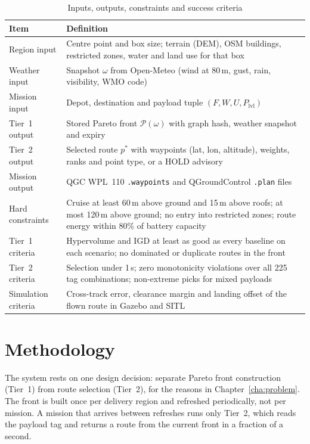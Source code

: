 \documentclass{ssnreview}
\newcommand{\flowchapter}[1]{\par\addvspace{30pt}\let\origclearpage\clearpage\let\clearpage\relax\chapter{#1}\let\clearpage\origclearpage}  %
\begin{document}
\begin{table}[H]
\centering\caption{Inputs, outputs, constraints and success criteria}\label{tab:ps-io}\small
\begin{tabularx}{\textwidth}{L{3.0cm} Y}
\toprule
\textbf{Item} & \textbf{Definition}\\
\midrule
Region input & Centre point and box size; terrain (DEM), OSM buildings, restricted zones, water and land use for that box\\
Weather input & Snapshot $\omega$ from Open-Meteo (wind at 80\,m, gust, rain, visibility, WMO code)\\
Mission input & Depot, destination and payload tuple $(F, W, U, P_\mathrm{lvl})$\\
Tier~1 output & Stored Pareto front $\mathcal{P}(\omega)$ with graph hash, weather snapshot and expiry\\
Tier~2 output & Selected route $p^*$ with waypoints (lat, lon, altitude), weights, ranks and point type, or a HOLD advisory\\
Mission output & QGC WPL~110 \texttt{.waypoints} and QGroundControl \texttt{.plan} files\\
Hard constraints & Cruise at least 60\,m above ground and 15\,m above roofs; at most 120\,m above ground; no entry into restricted zones; route energy within 80\% of battery capacity\\
Tier~1 criteria & Hypervolume and IGD at least as good as every baseline on each scenario; no dominated or duplicate routes in the front\\
Tier~2 criteria & Selection under 1\,s; zero monotonicity violations over all 225 tag combinations; non-extreme picks for mixed payloads\\
Simulation criteria & Cross-track error, clearance margin and landing offset of the flown route in Gazebo and SITL\\
\bottomrule
\end{tabularx}
\end{table}


\flowchapter{Methodology}\label{cha:methodology}

The system rests on one design decision: separate Pareto front construction (Tier~1)
from route selection (Tier~2), for the reasons in Chapter~\ref{cha:problem}. The
front is built once per delivery region and refreshed periodically, not per mission. A
mission that arrives between refreshes runs only Tier~2, which reads the payload tag and
returns a route from the current front in a fraction of a second.
\end{document}
